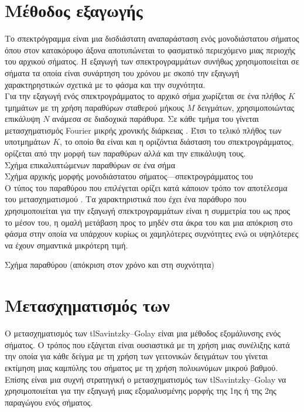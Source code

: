 \section{Μέθοδος εξαγωγής }
Το σπεκτρόγραμμα είναι μια δισδιάστατη αναπαράσταση ενός μονοδιάστατου σήματος όπου στον κατακόρυφο άξονα αποτυπώνεται το φασματικό περιεχόμενο μιας περιοχής του αρχικού σήματος. Η εξαγωγή των σπεκτρογραμμάτων συνήθως χρησιμοποιείται σε σήματα τα οποία είναι συνάρτηση του χρόνου με σκοπό την εξαγωγή χαρακτηρηστικών σχετικά με το φάσμα και την συχνότητα.\\
Για την εξαγωγή ενός σπεκτρογράμματος το αρχικό σήμα χωρίζεται σε ένα πλήθος $K$ τμημάτων με τη χρήση παραθύρων σταθερού μήκους $M$ δειγμάτων, χρησιμοποιώντας επικάλυψη $N$ ανάμεσα σε διαδοχικά παράθυρα. Σε κάθε τμήμα του γίνεται μετασχηματισμός Fourier μικρής χρονικής διάρκειας . Έτσι το τελικό πλήθος των υποτμημάτων $K$, το οποίο θα είναι και η οριζόντια διάσταση του σπεκτρογράμματος, ορίζεται από την μορφή των παραθύρων αλλά και την επικάλυψη τους.\\

Σχήμα επικαλυπτώμενων παραθύρων σε ένα σήμα\\

Σχήμα αρχικής μορφής μονοδιάστατου σήματος---σπεκτρογράμματος του\\

Ο τύπος του παραθύρου που επιλέγεται ορίζει κατά κάποιον τρόπο τον αποτέλεσμα του μετασχηματισμού . Τα χαρακτηριστικά που έχει ένα παράθυρο που χρησιμοποιείται για την εξαγωγή σπεκτρογραμμάτων είναι η συμμετρία του ως προς το μέσον του, η ομαλή μετάβαση προς το μηδέν στα άκρα του και μια απόκριση στο φάσμα στην οποία να υπάρχουν κυρίως οι χαμηλότερες συχνότητες ενώ οι υψηλότερες να έχουν σημαντικά μικρότερη τιμή.

Σχήμα παραθύρου (απόκριση στον χρόνο και στη συχνότητα)

\section{Μετασχηματισμός των }
Ο μετασχηματισμός των tl{Savintzky--Golay}\cite{savitzky_golay} είναι μια μέθοδος εξομάλυνσης ενός σήματος. Ο τρόπος που εξάγεται είναι ουσιαστικά με τη χρήση μιας συνέλιξης κατά την οποία για κάθε δείγμα με τη χρήση των γειτονικών δειγμάτων του γίνεται εκτίμηση μιας καμπύλης του σήματος με τη χρήση πολυωνύμων μικρού βαθμού. Επίσης είναι μια συχνή στρατηγική ο μετασχηματισμός των tl{Savintzky--Golay} να χρησιμοποιείται για την εξαγωγή μιας εξομαλυσμένης μορφής της 1ης ή της 2ης παραγώγου ενός σήματος.\\

